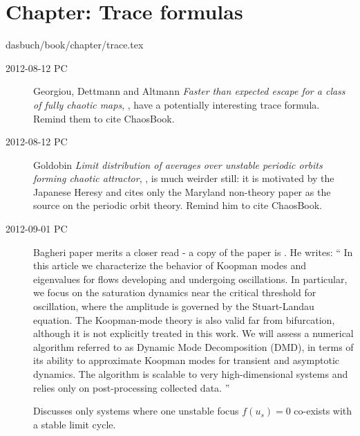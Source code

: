 %


\section{Chapter: Trace formulas}
\label{c-trace}\noindent dasbuch/book/chapter/trace.tex
\begin{description}
\item[2012-08-12 PC]
Georgiou, Dettmann and Altmann
\emph{Faster than expected escape for a class of fully chaotic maps}, ,
have a potentially interesting trace formula. Remind them to cite ChaosBook.

\item[2012-08-12 PC]
Goldobin \emph{Limit distribution of averages over
unstable periodic orbits forming chaotic attractor}, ,
is much weirder still: it is motivated by the Japanese Heresy and cites
only the Maryland non-theory paper as the source on the periodic orbit
theory.  Remind him to cite ChaosBook.

\item[2012-09-01 PC]							\toCB
Bagheri paper merits a closer read - a copy of the paper is
. He writes:
``
In this article we characterize the behavior of Koopman modes and
eigenvalues for flows developing and undergoing oscillations. In
particular, we focus on the saturation dynamics near the critical
threshold for oscillation, where the amplitude is governed by the
Stuart-Landau equation. The Koopman-mode theory is also valid far from
bifurcation, although it is not explicitly treated in this work. We will
assess a numerical algorithm referred to as Dynamic Mode Decomposition
(DMD), in terms of its ability to approximate Koopman modes for transient
and asymptotic dynamics. The algorithm is scalable to very
high-dimensional systems and relies only on post-processing collected
data.
''

Discusses only systems where one
unstable focus $f (u_s) = 0$ co-exists with a stable limit cycle.


\end{description}
